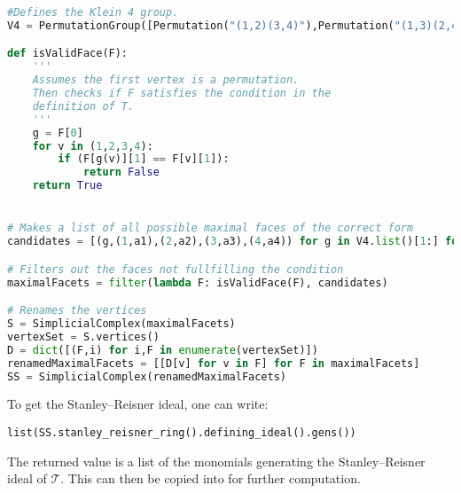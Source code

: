 \begin{lstlisting}[language=Python]
#Defines the Klein 4 group.
V4 = PermutationGroup([Permutation("(1,2)(3,4)"),Permutation("(1,3)(2,4)")])

def isValidFace(F):
    '''
    Assumes the first vertex is a permutation.
    Then checks if F satisfies the condition in the
    definition of T.
    '''
    g = F[0]
    for v in (1,2,3,4):
        if (F[g(v)][1] == F[v][1]):
            return False
    return True


# Makes a list of all possible maximal faces of the correct form
candidates = [(g,(1,a1),(2,a2),(3,a3),(4,a4)) for g in V4.list()[1:] for a1 in (1,2,3) for a2 in (1,2,3) for a3 in (1,2,3) for a4 in (1,2,3)]

# Filters out the faces not fullfilling the condition
maximalFacets = filter(lambda F: isValidFace(F), candidates)

# Renames the vertices
S = SimplicialComplex(maximalFacets)
vertexSet = S.vertices()
D = dict([(F,i) for i,F in enumerate(vertexSet)])
renamedMaximalFacets = [[D[v] for v in F] for F in maximalFacets]
SS = SimplicialComplex(renamedMaximalFacets)
\end{lstlisting}

To get the Stanley--Reisner ideal, one can write:
\begin{verbatim}
list(SS.stanley_reisner_ring().defining_ideal().gens())
\end{verbatim}
The returned value is a list of the monomials generating the Stanley--Reisner ideal of $\mathcal T$. This can then be copied into \MM for further computation.

